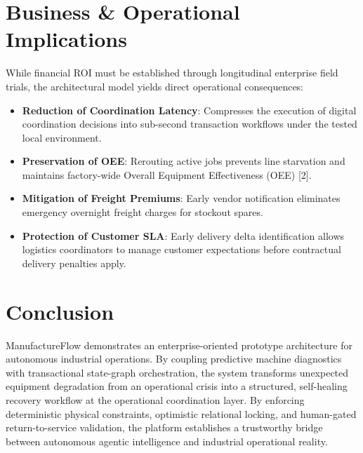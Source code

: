 \documentclass[10pt,twocolumn,a4paper]{article}
\begin{document}
\section{Business \& Operational Implications}
\label{sec:business_implications}
While financial ROI must be established through longitudinal enterprise field trials, the architectural model yields direct operational consequences:
\begin{itemize}
    \item \textbf{Reduction of Coordination Latency}: Compresses the execution of digital coordination decisions into sub-second transaction workflows under the tested local environment.
    \item \textbf{Preservation of OEE}: Rerouting active jobs prevents line starvation and maintains factory-wide Overall Equipment Effectiveness (OEE) [2].
    \item \textbf{Mitigation of Freight Premiums}: Early vendor notification eliminates emergency overnight freight charges for stockout spares.
    \item \textbf{Protection of Customer SLA}: Early delivery delta identification allows logistics coordinators to manage customer expectations before contractual delivery penalties apply.
\end{itemize}

\section{Conclusion}
\label{sec:conclusion}
ManufactureFlow demonstrates an enterprise-oriented prototype architecture for autonomous industrial operations. By coupling predictive machine diagnostics with transactional state-graph orchestration, the system transforms unexpected equipment degradation from an operational crisis into a structured, self-healing recovery workflow at the operational coordination layer. By enforcing deterministic physical constraints, optimistic relational locking, and human-gated return-to-service validation, the platform establishes a trustworthy bridge between autonomous agentic intelligence and industrial operational reality.

\end{document}
